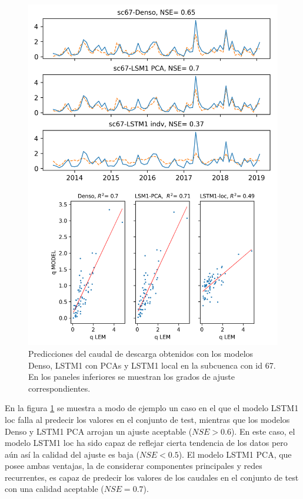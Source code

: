 \begin{figure}[h!]
  \begin{center}
    \includegraphics[height=6.in]{Figures/comp_grilla/resultados_sc67.png}
    \caption{ Predicciones del caudal de descarga obtenidos con los modelos Denso, 
    LSTM1 con PCAs y LSTM1 local en la subcuenca con id 67. En los
    paneles inferiores se muestran los grados de ajuste correspondientes.}
    \label{alcomp67}
  \end{center}
\end{figure}

En la figura \ref{alcomp67} se muestra  a modo de ejemplo un caso en el que el modelo LSTM1 loc falla 
al predecir los valores en el conjunto de test, mientras que los modelos Denso y LSTM1 PCA arrojan un ajuste aceptable
 ($NSE>0.6$). En este caso, el modelo LSTM1 loc ha sido capaz de reflejar 
cierta tendencia de los datos pero aún así la calidad del ajuste es baja ($NSE<0.5$). El modelo LSTM1 PCA, que 
posee ambas ventajas, la de considerar componentes principales y redes recurrentes, es capaz de predecir los valores de los caudales
en el conjunto de test con una calidad aceptable ($NSE=0.7$). 


